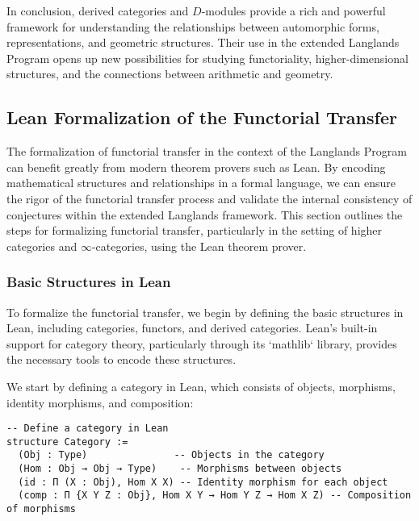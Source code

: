\documentclass{article}
\theoremstyle{remark}
\begin{document}
In conclusion, derived categories and $D$-modules provide a rich and powerful framework for understanding the relationships between automorphic forms, representations, and geometric structures. Their use in the extended Langlands Program opens up new possibilities for studying functoriality, higher-dimensional structures, and the connections between arithmetic and geometry.

\subsection{Lean Formalization of the Functorial Transfer}

The formalization of functorial transfer in the context of the Langlands Program can benefit greatly from modern theorem provers such as Lean. By encoding mathematical structures and relationships in a formal language, we can ensure the rigor of the functorial transfer process and validate the internal consistency of conjectures within the extended Langlands framework. This section outlines the steps for formalizing functorial transfer, particularly in the setting of higher categories and $\infty$-categories, using the Lean theorem prover.

\subsubsection{Basic Structures in Lean}

To formalize the functorial transfer, we begin by defining the basic structures in Lean, including categories, functors, and derived categories. Lean’s built-in support for category theory, particularly through its `mathlib` library, provides the necessary tools to encode these structures.

We start by defining a category in Lean, which consists of objects, morphisms, identity morphisms, and composition:

\begin{lstlisting}
-- Define a category in Lean
structure Category :=
  (Obj : Type)               -- Objects in the category
  (Hom : Obj → Obj → Type)    -- Morphisms between objects
  (id : Π (X : Obj), Hom X X) -- Identity morphism for each object
  (comp : Π {X Y Z : Obj}, Hom X Y → Hom Y Z → Hom X Z) -- Composition of morphisms
\end{lstlisting}
\end{document}
